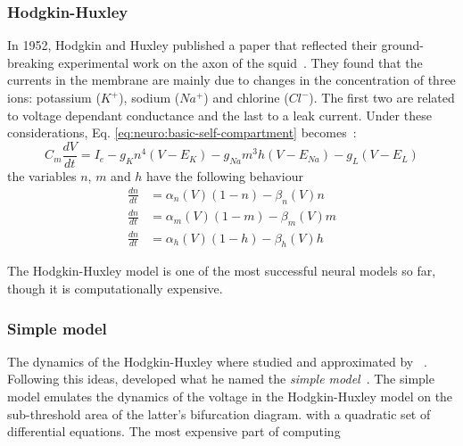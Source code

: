 \subsubsection{Hodgkin-Huxley}
In 1952, Hodgkin and Huxley published a paper that reflected their ground-breaking experimental work on the axon of the squid~\cite{hodgkin-huxley}. They found that the currents in the membrane are mainly due to changes in the concentration of three ions: potassium ($K^{+}$), sodium ($Na^{+}$) and chlorine ($Cl^{-}$). The first two are related to voltage dependant conductance and the last to a leak current. Under these considerations, Eq. \ref{eq:neuro:basic-self-compartment} becomes~\cite{dynamical-systems-Izhikevich2007}:
\begin{equation}
C_{m}\frac{dV}{dt} = I_{e} - g_{K}  n^{4} (V - E_{K}) 
                           - g_{Na} m^{3}h(V - E_{Na})
                           - g_{L}        (V - E_{L})
\label{eq:neuro:hodgkin-huxley}
\end{equation}
the variables $n$, $m$ and $h$ have the following behaviour
\begin{align}
\frac{dn}{dt} &= \alpha_{n}(V) (1 - n) - \beta_{n}(V) n \\[0.5em]
\frac{dn}{dt} &= \alpha_{m}(V) (1 - m) - \beta_{m}(V) m\\[0.5em]
\frac{dn}{dt} &= \alpha_{h}(V) (1 - h) - \beta_{h}(V) h
\end{align}

The Hodgkin-Huxley model is one of the most successful neural models so far, though it is computationally expensive.

\subsubsection{Simple model}
The dynamics of the Hodgkin-Huxley where studied and approximated by \citeauthor{fitzhugh1961impulses}~\cite{fitzhugh1961impulses}. Following this ideas, \citeauthor{izhikevich2003simple} developed what he named the \emph{simple model}~\cite{izhikevich2003simple}. The simple model emulates the dynamics of the voltage in the Hodgkin-Huxley model on the sub-threshold area of the latter's bifurcation diagram. with a quadratic set of differential equations.
The most expensive part of computing

